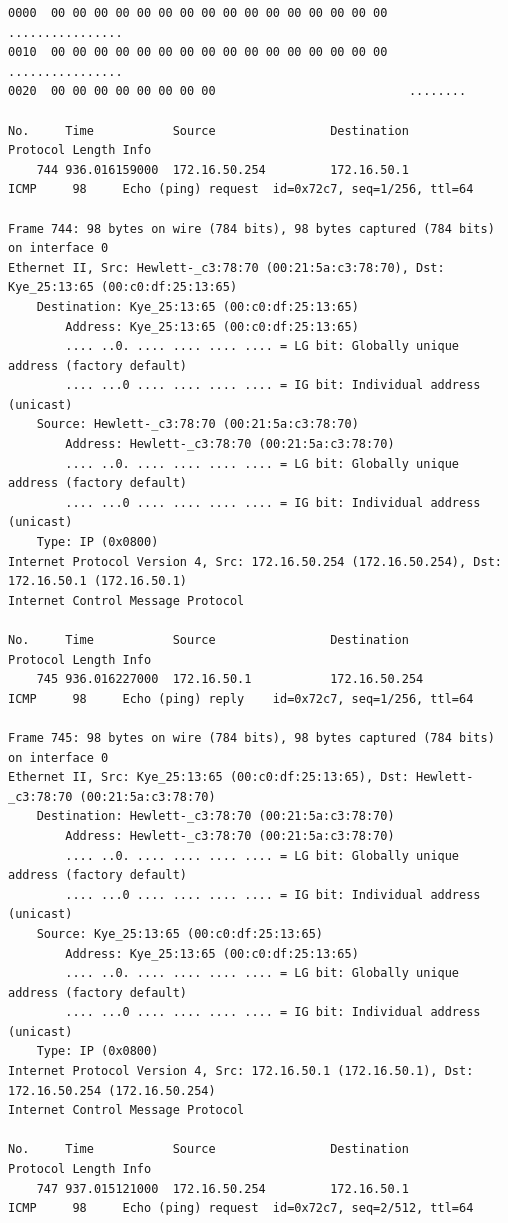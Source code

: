 \documentclass[a4paper,11pt]{article}
\begin{document}
\begin{lstlisting}
0000  00 00 00 00 00 00 00 00 00 00 00 00 00 00 00 00   ................
0010  00 00 00 00 00 00 00 00 00 00 00 00 00 00 00 00   ................
0020  00 00 00 00 00 00 00 00                           ........

No.     Time           Source                Destination           Protocol Length Info
    744 936.016159000  172.16.50.254         172.16.50.1           ICMP     98     Echo (ping) request  id=0x72c7, seq=1/256, ttl=64

Frame 744: 98 bytes on wire (784 bits), 98 bytes captured (784 bits) on interface 0
Ethernet II, Src: Hewlett-_c3:78:70 (00:21:5a:c3:78:70), Dst: Kye_25:13:65 (00:c0:df:25:13:65)
    Destination: Kye_25:13:65 (00:c0:df:25:13:65)
        Address: Kye_25:13:65 (00:c0:df:25:13:65)
        .... ..0. .... .... .... .... = LG bit: Globally unique address (factory default)
        .... ...0 .... .... .... .... = IG bit: Individual address (unicast)
    Source: Hewlett-_c3:78:70 (00:21:5a:c3:78:70)
        Address: Hewlett-_c3:78:70 (00:21:5a:c3:78:70)
        .... ..0. .... .... .... .... = LG bit: Globally unique address (factory default)
        .... ...0 .... .... .... .... = IG bit: Individual address (unicast)
    Type: IP (0x0800)
Internet Protocol Version 4, Src: 172.16.50.254 (172.16.50.254), Dst: 172.16.50.1 (172.16.50.1)
Internet Control Message Protocol

No.     Time           Source                Destination           Protocol Length Info
    745 936.016227000  172.16.50.1           172.16.50.254         ICMP     98     Echo (ping) reply    id=0x72c7, seq=1/256, ttl=64

Frame 745: 98 bytes on wire (784 bits), 98 bytes captured (784 bits) on interface 0
Ethernet II, Src: Kye_25:13:65 (00:c0:df:25:13:65), Dst: Hewlett-_c3:78:70 (00:21:5a:c3:78:70)
    Destination: Hewlett-_c3:78:70 (00:21:5a:c3:78:70)
        Address: Hewlett-_c3:78:70 (00:21:5a:c3:78:70)
        .... ..0. .... .... .... .... = LG bit: Globally unique address (factory default)
        .... ...0 .... .... .... .... = IG bit: Individual address (unicast)
    Source: Kye_25:13:65 (00:c0:df:25:13:65)
        Address: Kye_25:13:65 (00:c0:df:25:13:65)
        .... ..0. .... .... .... .... = LG bit: Globally unique address (factory default)
        .... ...0 .... .... .... .... = IG bit: Individual address (unicast)
    Type: IP (0x0800)
Internet Protocol Version 4, Src: 172.16.50.1 (172.16.50.1), Dst: 172.16.50.254 (172.16.50.254)
Internet Control Message Protocol

No.     Time           Source                Destination           Protocol Length Info
    747 937.015121000  172.16.50.254         172.16.50.1           ICMP     98     Echo (ping) request  id=0x72c7, seq=2/512, ttl=64


\end{lstlisting}
\end{document}
